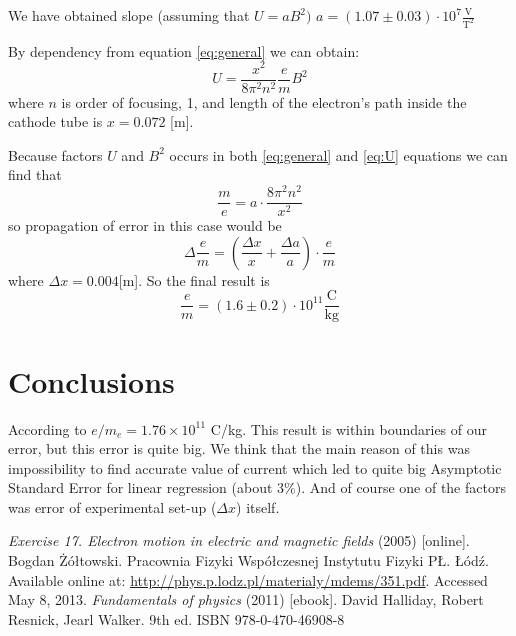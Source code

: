 \documentclass[a4paper,12pt]{article}
\begin{document}
    We have obtained slope (assuming that $U = aB^2)$ $a = (1.07 \pm 0.03) \cdot 10^{7} \frac{\mathrm{V}}{\mathrm{T}^2}$

    By dependency from equation \ref{eq:general} we can obtain:
    \begin{equation}
        U = \frac{x^2}{8\pi^2 n^2}\frac{e}{m}{B^2} \label{eq:U}
    \end{equation}
    where $n$ is order of focusing, 1, and length of the electron's path inside the cathode tube is $x = 0.072$ [m].  

    Because factors $U$ and $B^2$ occurs in both \ref{eq:general} and \ref{eq:U} equations we can find that 
    \begin{equation}
        \frac{m}{e} = a \cdot \frac{8\pi^2 n^2}{x^2}
    \end{equation}
    so propagation of error in this case would be 
    \begin{equation}
        \Delta \frac{e}{m} = \left(\frac{\Delta x}{x} + \frac{\Delta a}{a}\right) \cdot \frac{e}{m}
    \end{equation}
    where $\Delta x = 0.004$[m].
    So the final result is 
    \begin{displaymath}
        \frac{e}{m} = (1.6\pm0.2) \cdot 10^{11} \frac{\mathrm{C}}{\mathrm{kg}}
    \end{displaymath}
    

    \section{Conclusions}
    According to \cite{HRW} $e/m_e = 1.76 \times 10^{11}$ C/kg. This result is within boundaries of our error, but this error is quite big. We think that the main reason of this was impossibility to find accurate value of current which led to quite big Asymptotic Standard Error for linear regression (about 3\%). And of course one of the factors was error of experimental set-up ($\Delta x$) itself.  

    \begin{thebibliography}{9}
        \emph{Exercise 17. Electron motion in electric and magnetic fields} (2005) [online]. Bogdan Żółtowski. Pracownia Fizyki Współczesnej Instytutu Fizyki PŁ. Łódź. Available online at: \url{http://phys.p.lodz.pl/materialy/mdems/351.pdf}. Accessed May 8, 2013.
        \emph{Fundamentals of physics} (2011) [ebook]. David Halliday, Robert Resnick, Jearl Walker. 9th ed. ISBN 978-0-470-46908-8

    \end{thebibliography}
\end{document}
